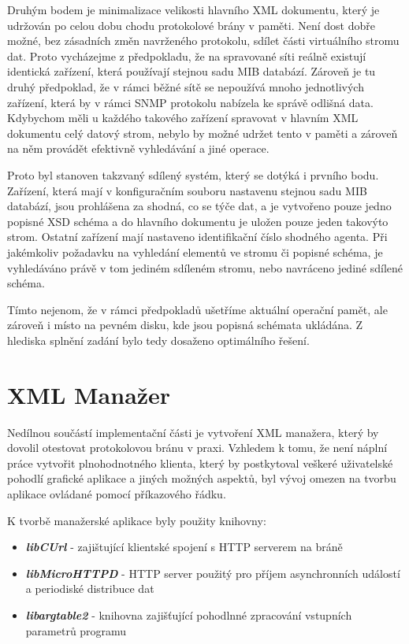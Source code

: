 Druhým bodem je minimalizace velikosti hlavního XML dokumentu, který je udržován po celou dobu chodu protokolové brány v paměti. Není dost dobře možné, bez zásadních změn
navrženého protokolu, sdílet části virtuálního stromu dat. Proto vycházejme z předpokladu, že na spravované síti reálně existují identická zařízení, která používají
stejnou sadu MIB databází. Zároveň je tu druhý předpoklad, že v rámci běžné sítě se nepoužívá mnoho jednotlivých zařízení, která by v rámci SNMP protokolu nabízela ke správě odlišná data.
Kdybychom měli u každého takového zařízení spravovat v hlavním XML dokumentu celý datový strom, nebylo by možné udržet tento v paměti a zároveň na něm provádět
efektivně vyhledávání a jiné operace.

Proto byl stanoven takzvaný sdílený systém, který se dotýká i prvního bodu. Zařízení, která mají v konfiguračním souboru nastavenu stejnou sadu MIB databází, jsou prohlášena za shodná, co se týče
dat, a je vytvořeno pouze jedno popisné XSD schéma a do hlavního dokumentu je uložen pouze jeden takovýto strom. Ostatní zařízení mají nastaveno identifikační číslo shodného agenta.
Při jakémkoliv požadavku na vyhledání elementů ve stromu či popisné schéma, je vyhledáváno právě v tom jediném sdíleném stromu, nebo navráceno jediné sdílené schéma.

Tímto nejenom, že v rámci předpokladů ušetříme aktuální operační pamět, ale zároveň i místo na pevném disku, kde jsou popisná schémata ukládána. Z hlediska splnění zadání bylo tedy
dosaženo optimálního řešení.


\section{XML Manažer}
Nedílnou součástí implementační části je vytvoření XML manažera, který by dovolil otestovat protokolovou bránu v praxi. Vzhledem k tomu, že není náplní práce vytvořit plnohodnotného
klienta, který by postkytoval veškeré uživatelské pohodlí grafické aplikace a jiných možných aspektů, byl vývoj omezen na tvorbu aplikace ovládané pomocí příkazového řádku.

K tvorbě manažerské aplikace byly použity knihovny:
\begin{itemize}
	\item \textbf{ \textit{libCUrl} } - zajištující klientské spojení s HTTP serverem na bráně
	\item \textbf{ \textit{libMicroHTTPD} } - HTTP server použitý pro příjem asynchronních událostí a periodiské distribuce dat
	\item \textbf{ \textit{libargtable2} } - knihovna zajišťující pohodlnné zpracování vstupních parametrů programu
\end{itemize}

